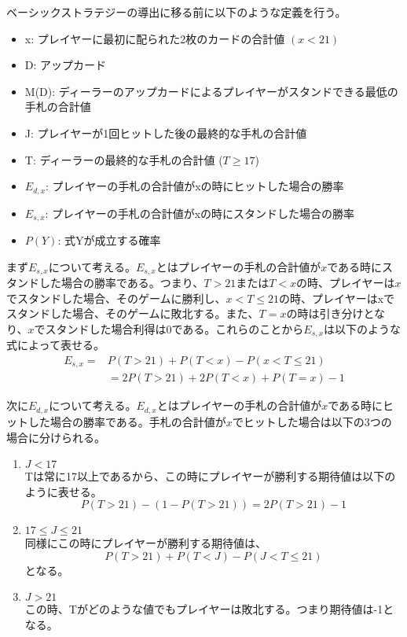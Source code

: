         ベーシックストラテジーの導出に移る前に以下のような定義を行う。
        \begin{itemize}
            \item[] x: プレイヤーに最初に配られた2枚のカードの合計値 \((x < 21)\)
            \item[] D: アップカード
            \item[] M(D): ディーラーのアップカードによるプレイヤーがスタンドできる最低の手札の合計値
            \item[] J: プレイヤーが1回ヒットした後の最終的な手札の合計値
            \item[] T: ディーラーの最終的な手札の合計値 (\(T \geq 17\))
            \item[] \(E_{d,x}\): プレイヤーの手札の合計値がxの時にヒットした場合の勝率
            \item[] \(E_{s,x}\): プレイヤーの手札の合計値がxの時にスタンドした場合の勝率
            \item[] \(P(Y)\): 式Yが成立する確率
        \end{itemize}

        まず\(E_{s,x}\)について考える。\(E_{s,x}\)とはプレイヤーの手札の合計値が$x$である時にスタンドした場合の勝率である。つまり、\(T > 21 \)または\(T < x\)の時、プレイヤーは$x$でスタンドした場合、そのゲームに勝利し、\(x < T \leq 21\)の時、プレイヤーはxでスタンドした場合、そのゲームに敗北する。また、\(T = x\)の時は引き分けとなり、$x$でスタンドした場合利得は0である。これらのことから\(E_{s,x}\)は以下のような式によって表せる。
        \begin{displaymath}
            \begin{split}
                E_{s,x} = &P(T > 21) + P(T < x) - P(x < T \leq 21)\\
                &= 2P(T > 21) + 2P(T < x) + P(T = x) - 1
            \end{split}
        \end{displaymath}
        
        次に\(E_{d,x}\)について考える。\(E_{d,x}\)とはプレイヤーの手札の合計値が$x$である時にヒットした場合の勝率である。手札の合計値が$x$でヒットした場合は以下の3つの場合に分けられる。
        \begin{enumerate}
            \item \(J < 17\)\\
                Tは常に17以上であるから、この時にプレイヤーが勝利する期待値は以下のように表せる。
                $$P(T > 21) - (1 - P(T > 21)) = 2P(T > 21) - 1$$
            \item \(17 \leq J \leq 21\)\\
                同様にこの時にプレイヤーが勝利する期待値は、
                $$P(T > 21) + P(T < J) - P(J < T \leq 21)$$
                となる。
            \item \(J > 21\)\\
                この時、Tがどのような値でもプレイヤーは敗北する。つまり期待値は-1となる。
        \end{enumerate}

